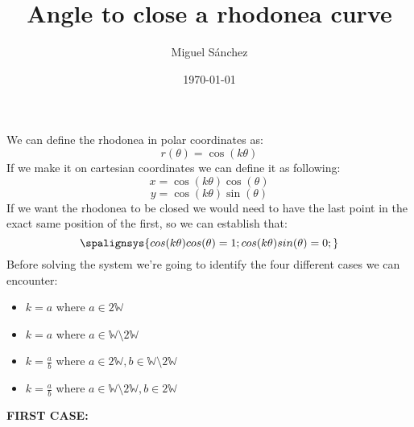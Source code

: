 \documentclass[12pt, a4paper]{article}
\author{Miguel Sánchez}
\title{Angle to close a rhodonea curve}
\date{\today}
\begin{document}
\maketitle
\noindent
 We can define the rhodonea in polar coordinates as:
 \begin{equation}
  r(\theta) = \cos(k\theta)
 \end{equation}
 If we make it on cartesian coordinates we can define it as following:
 \begin{equation}
  x = \cos(k\theta)\cos(\theta)
 \end{equation}
 \begin{equation}
  y = \cos(k\theta)\sin(\theta)
 \end{equation}
 If we want the rhodonea to be closed we would need to have the last point in the exact same position of the first, so we can establish that:
\[
  \spalignsys{
    cos (k\theta)cos(\theta) = 1 ;
    cos (k\theta)sin(\theta) = 0 ;
  }
\]
Before solving the system we're going to identify the four different cases we can encounter:
\begin{itemize}
 \item $k = a$ where $a\in2\mathbb{W}$
 \item $k = a$ where $a\in\mathbb{W}\setminus2\mathbb{W}$
 \item $k = \frac{a}{b}$ where $a \in2\mathbb{W}, b \in\mathbb{W}\setminus2\mathbb{W}$
 \item $k = \frac{a}{b}$ where $a\in\mathbb{W}\setminus2\mathbb{W}, b\in2\mathbb{W}$
\end{itemize}
\newpage
\noindent
\textbf{FIRST CASE:}
\end{document}
